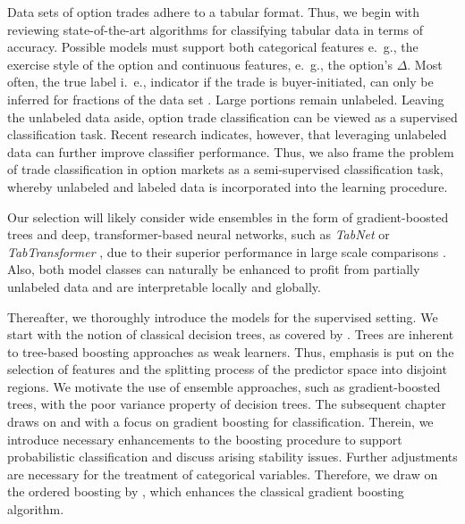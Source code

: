 Data sets of option trades adhere to a tabular format.  Thus, we begin with reviewing state-of-the-art algorithms for classifying tabular data in terms of accuracy. Possible models must support both categorical features e.~g., the exercise style of the option and continuous features, e.~g., the option's $\Delta$. Most often, the true label i.~e., indicator if the trade is buyer-initiated, can only be inferred for fractions of the data set \autocites{grauerOptionTradeClassification2022}{savickasInferringDirectionOption2003}. Large portions remain unlabeled. Leaving the unlabeled data aside, option trade classification can be viewed as a supervised classification task. Recent research \autocites{arikTabNetAttentiveInterpretable2020}{huangTabTransformerTabularData2020}{yoonVIMEExtendingSuccess2020} indicates, however, that leveraging unlabeled data can further improve classifier performance. Thus, we also frame the problem of trade classification in option markets as a semi-supervised classification task, whereby unlabeled and labeled data is incorporated into the learning procedure. 

Our selection will likely consider wide ensembles in the form of gradient-boosted trees and deep, transformer-based neural networks, such as \textit{TabNet} \autocite{arikTabNetAttentiveInterpretable2020} or \textit{TabTransformer} \autocite{huangTabTransformerTabularData2020}, due to their superior performance in large scale comparisons \autocites{borisovDeepNeuralNetworks2022}{gorishniyRevisitingDeepLearning2021}{grinsztajnWhyTreebasedModels2022}{shwartz-zivTabularDataDeep2021}. Also, both model classes can naturally be enhanced to profit from partially unlabeled data and are interpretable locally and globally. 

Thereafter, we thoroughly introduce the models for the supervised setting. We start with the notion of classical decision trees, as covered by \textcite{breimanClassificationRegressionTrees2017}. Trees are inherent to tree-based boosting approaches as weak learners. Thus, emphasis is put on the selection of features and the splitting process of the predictor space into disjoint regions. We motivate the use of ensemble approaches, such as gradient-boosted trees, with the poor variance property of decision trees. The subsequent chapter draws on \textcite{hastietrevorElementsStatisticalLearning2009} and \textcite{friedmanGreedyFunctionApproximation2001} with a focus on gradient boosting for classification. Therein, we introduce necessary enhancements to the boosting procedure to support probabilistic classification and discuss arising stability issues. Further adjustments are necessary for the treatment of categorical variables. Therefore, we draw on the ordered boosting by \textcite{prokhorenkovaCatBoostUnbiasedBoosting2018}, which enhances the classical gradient boosting algorithm.

